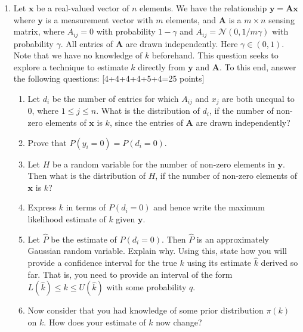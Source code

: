 \documentclass[11pt]{article}
\begin{document}
\begin{enumerate}
\item Let $\boldsymbol{x}$ be a real-valued vector of $n$ elements. We have the relationship $\boldsymbol{y} = \boldsymbol{Ax}$ where $\boldsymbol{y}$ is a measurement vector with $m$ elements, and $\boldsymbol{A}$ is a $m \times n$ sensing matrix, where $A_{ij} = 0$ with probability $1-\gamma$ and $A_{ij} = \mathcal{N}(0,1/{m\gamma})$ with probability $\gamma$. All entries of $\boldsymbol{A}$ are drawn independently. Here $\gamma \in (0,1)$. Note that we have no knowledge of $k$ beforehand. This question seeks to explore a technique to estimate $k$ directly from $\boldsymbol{y}$ and $\boldsymbol{A}$. To this end, answer the following questions: \textsf{[4+4+4+4+5+4=25 points]}
\begin{enumerate}
\item Let $d_i$ be the number of entries for which $A_{ij}$ and $x_j$ are both unequal to 0, where $1 \leq j \leq n$. What is the distribution of $d_i$, if the number of non-zero elements of $\boldsymbol{x}$ is $k$, since the entries of $\boldsymbol{A}$ are drawn independently?
\item Prove that $P(y_i = 0) = P(d_i = 0)$. 
\item Let $H$ be a random variable for the number of non-zero elements in $\boldsymbol{y}$. Then what is the distribution of $H$, if the number of non-zero elements of $\boldsymbol{x}$ is $k$?
\item Express $k$ in terms of $P(d_i = 0)$ and hence write the maximum likelihood estimate of $k$ given $\boldsymbol{y}$. 
\item Let $\hat{P}$ be the estimate of $P(d_i = 0)$. Then $\hat{P}$ is an approximately Gaussian random variable. Explain why. Using this, state how you will provide a confidence interval for the true $k$ using its estimate $\hat{k}$ derived so far. That is, you need to provide an interval of the form $L(\hat{k}) \leq k \leq U(\hat{k})$ with some probability $q$.
\item Now consider that you had knowledge of some prior distribution $\pi(k)$ on $k$. How does your estimate of $k$ now change?  
\end{enumerate}

\end{enumerate}
\end{document}
